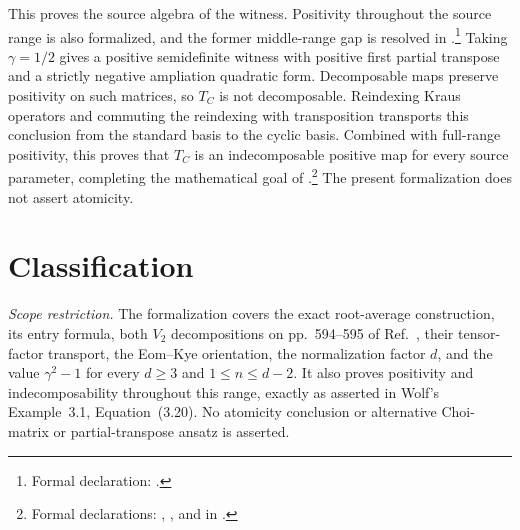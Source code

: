 \documentclass{article}
\begin{document}
This proves the source algebra of the witness. Positivity throughout the source
range is also formalized, and the former middle-range gap is resolved in
.\footnote{Formal declaration:
.}
Taking $\gamma=1/2$ gives a positive semidefinite witness with positive
first partial transpose and a strictly negative ampliation quadratic form.
Decomposable maps preserve positivity on such matrices, so $T_C$ is not
decomposable. Reindexing Kraus operators and commuting the reindexing with
transposition transports this conclusion from the standard basis to the
cyclic basis. Combined with full-range positivity, this proves that $T_C$
is an indecomposable positive map for every source parameter, completing
the mathematical goal of .\footnote{Formal declarations:
,
, and
 in
.}
The present formalization does not assert atomicity.

\section{Classification}

\emph{Scope restriction.} The formalization covers the exact root-average
construction, its entry formula, both $V_2$ decompositions on pp.~594--595 of
Ref.~\cite{Ha1998AtomicPositiveMaps}, their tensor-factor transport, the
Eom--Kye orientation, the normalization factor $d$, and the value
$\gamma^2-1$ for every $d\geq3$ and $1\leq n\leq d-2$. It also proves
positivity and indecomposability throughout this range, exactly as asserted
in Wolf's Example~3.1, Equation~(3.20).
No atomicity conclusion or alternative Choi-matrix or partial-transpose ansatz
is asserted.



\end{document}
